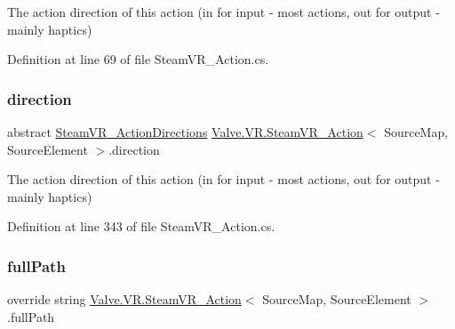 The action direction of this action (in for input -\/ most actions, out for output -\/ mainly haptics) 



Definition at line 69 of file Steam\+V\+R\+\_\+\+Action.\+cs.

\mbox{\label{class_valve_1_1_v_r_1_1_steam_v_r___action_aa47ba3da1a7fa07d5f4d70fcae84f778}} 
\subsubsection{\texorpdfstring{direction}{direction}\hspace{0.1cm}{\footnotesize\ttfamily [2/2]}}
{\footnotesize\ttfamily abstract \mbox{\hyperlink{namespace_valve_1_1_v_r_a1e6192cb5ddaf204afab87ccb5728780}{Steam\+V\+R\+\_\+\+Action\+Directions}} \mbox{\hyperlink{class_valve_1_1_v_r_1_1_steam_v_r___action}{Valve.\+V\+R.\+Steam\+V\+R\+\_\+\+Action}}$<$ Source\+Map, Source\+Element $>$.direction\hspace{0.3cm}{\ttfamily [get]}}



The action direction of this action (in for input -\/ most actions, out for output -\/ mainly haptics) 



Definition at line 343 of file Steam\+V\+R\+\_\+\+Action.\+cs.

\mbox{\label{class_valve_1_1_v_r_1_1_steam_v_r___action_a765a5c4c2de688392f4968fa3dcf2703}} 
\subsubsection{\texorpdfstring{fullPath}{fullPath}\hspace{0.1cm}{\footnotesize\ttfamily [1/2]}}
{\footnotesize\ttfamily override string \mbox{\hyperlink{class_valve_1_1_v_r_1_1_steam_v_r___action}{Valve.\+V\+R.\+Steam\+V\+R\+\_\+\+Action}}$<$ Source\+Map, Source\+Element $>$.full\+Path\hspace{0.3cm}{\ttfamily [get]}}



